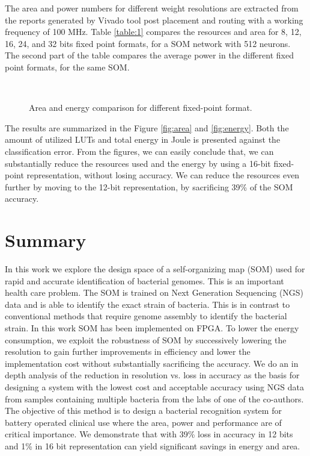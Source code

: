 The area and power numbers for different weight resolutions are extracted from the reports generated by Vivado tool post placement and routing with a working frequency of 100 MHz.
Table \ref{table:1} compares the resources and area for 8, 12, 16, 24, and 32 bits fixed point formats, for a SOM network with 512 neurons. The second part of the table compares the average power in the different fixed point formats, for the same SOM.

\begin{figure}[htb]
	\centering
	~
	\caption{ Area and energy comparison for different fixed-point format.}
	\label{fig:metrics}
\end{figure}
The results are summarized in the Figure \ref{fig:area} and \ref{fig:energy}. Both the amount of utilized LUTs and total energy in Joule is presented against the classification error. From the figures, we can easily conclude that, we can substantially reduce the resources used and the energy by using a 16-bit fixed-point representation, without losing accuracy. We can reduce the resources even further by moving to the 12-bit representation, by sacrificing 39\% of the SOM accuracy. 
\section{Summary}
In this work we explore the design space of a self-organizing map (SOM) used for rapid and accurate identification of bacterial genomes. This is an important health care problem.  The  SOM is trained on Next Generation Sequencing (NGS) data and is able to identify the exact strain of bacteria. This is in contrast to conventional methods that require genome assembly to identify the bacterial strain. In this work SOM has been implemented on FPGA. To lower the energy consumption, we exploit the robustness of SOM by successively lowering the resolution to gain further improvements in efficiency and lower the implementation cost without substantially sacrificing the accuracy. We do an in depth analysis of the reduction in resolution vs. loss in accuracy as the basis for designing a system with the lowest cost and acceptable accuracy using NGS data from  samples containing multiple bacteria from the labs of one of the co-authors. The objective of this method is to design a bacterial recognition system for battery operated clinical use where the area, power and performance are of critical importance. We demonstrate that with 39\% loss in accuracy in 12 bits and 1\% in 16 bit representation can yield significant savings in energy and area.

